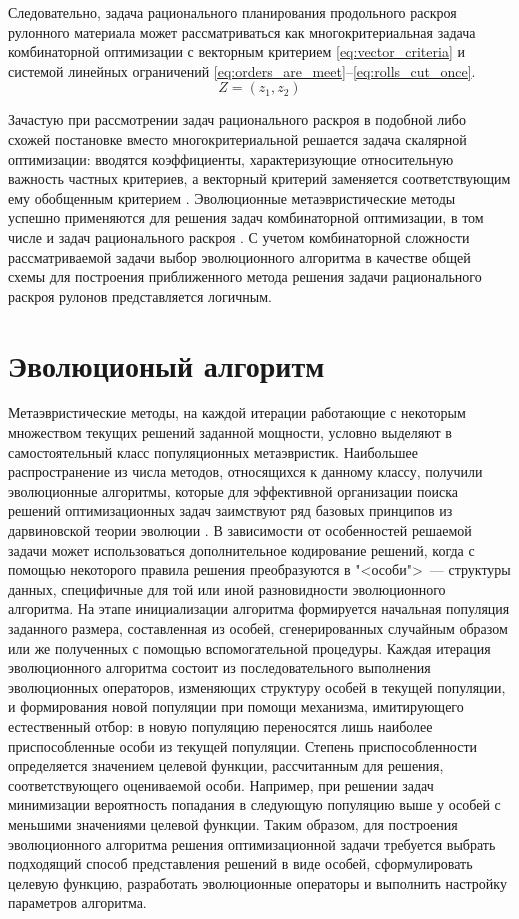 \documentclass[12pt]{article}
\begin{document}
Следовательно, задача рационального планирования продольного раскроя рулонного 
материала может рассматриваться как многокритериальная задача комбинаторной 
оптимизации с векторным критерием 
\eqref{eq:vector_criteria} 
и системой линейных ограничений 
\eqref{eq:orders_are_meet}--\eqref{eq:rolls_cut_once}.
\begin{equation}\label{eq:vector_criteria}
    Z=(z_1,z_2)
\end{equation}

Зачастую при рассмотрении задач рационального раскроя в подобной либо схожей 
постановке вместо многокритериальной решается задача скалярной оптимизации: 
вводятся коэффициенты, характеризующие относительную важность частных 
критериев, а векторный критерий заменяется соответствующим ему обобщенным 
критерием 
\cite{haessler88, song06, schilling02}. 
Эволюционные метаэвристические методы успешно 
применяются для решения задач комбинаторной оптимизации, в том числе и задач 
рационального раскроя 
\cite{golfeto09}. 
С учетом комбинаторной сложности рассматриваемой 
задачи выбор эволюционного алгоритма в качестве общей схемы для построения 
приближенного метода решения задачи рационального раскроя рулонов 
представляется логичным.


\section{Эволюционый алгоритм}

Метаэвристические методы, на каждой итерации работающие с некоторым множеством 
текущих решений заданной мощности, условно выделяют в 
самостоятельный класс популяционных метаэвристик. Наибольшее распространение 
из числа методов, относящихся к данному классу, получили эволюционные 
алгоритмы, которые для эффективной организации поиска решений оптимизационных 
задач заимствуют ряд базовых принципов из дарвиновской теории эволюции 
\cite{skobtsov08}. 
В зависимости от особенностей 
решаемой задачи может использоваться дополнительное кодирование решений, когда 
с помощью некоторого правила решения преобразуются в "<особи">~--- структуры 
данных, специфичные для той или иной разновидности эволюционного алгоритма. 
На этапе инициализации алгоритма формируется начальная популяция заданного 
размера, составленная из особей, сгенерированных случайным образом или же 
полученных с помощью вспомогательной процедуры. Каждая итерация эволюционного 
алгоритма состоит из последовательного выполнения эволюционных операторов, 
изменяющих структуру особей в текущей популяции, и формирования новой популяции 
при помощи механизма, имитирующего естественный отбор: в новую популяцию 
переносятся лишь наиболее приспособленные особи из текущей популяции. Степень 
приспособленности определяется значением целевой функции, рассчитанным для 
решения, соответствующего оцениваемой особи. Например, при решении задач 
минимизации вероятность попадания в следующую популяцию выше у особей с 
меньшими значениями целевой функции. Таким образом, для построения 
эволюционного алгоритма решения оптимизационной задачи требуется выбрать 
подходящий способ представления решений в виде особей, сформулировать целевую 
функцию, разработать эволюционные операторы и выполнить настройку параметров 
алгоритма.
\end{document}
